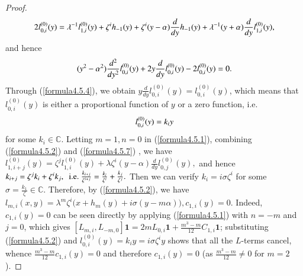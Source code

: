 \documentclass[12pt,reqno]{amsart}
\def\C{\mathbb{C}}
\numberwithin{equation}{section}
\begin{document}
\begin{proof}
\begin{equation*}
\aligned
2l_{0,i}^{(0)}(y)=\lambda^{-1}l_{1,i}^{(0)}(y)+\zeta^ih_{-1}(y)+\zeta^i(y-\alpha)\frac{d}{d{y}} h_{-1}(y)+\lambda^{-1}(y+\alpha)\frac{d}{d{y}} l_{1,i}^{(0)}(y),
\endaligned
\end{equation*}
and hence
\begin{equation}\label{formula4.5.6}
\aligned
(y^2-\alpha^2)\frac{d^2}{d{y^2}}l_{0,i}^{(0)}(y)+2y\frac{d}{d{y}}l_{0,i}^{(0)}(y)-2l_{0,i}^{(0)}(y)=0.
\endaligned
\end{equation}
Through (\ref{formula4.5.4}), we obtain $y\frac{d}{d{y}}l_{0,i}^{(0)}(y)=l_{0,i}^{(0)}(y)$, which means that $l_{0,i}^{(0)}(y)$ is either a proportional function of $y$ or a zero function, i.e. 
\begin{equation}\label{formula4.5.7}
\aligned
l_{0,i}^{(0)}(y)=k_iy
\endaligned
\end{equation}
 for some $k_i\in \C$. Letting $m=1,n=0$ in (\ref{formula4.5.1}), combining (\ref{formula4.5.2}) and (\ref{formula4.5.7}) ,  we have $l_{1,i+j}^{(0)}(y)=\zeta^jl_{1,i}^{(0)}(y)+\lambda\zeta^i(y-\alpha)\frac{d}{d{y}}l_{0,j}^{(0)}(y),$
and hence $k_{i+j}=\zeta^jk_i+\zeta^ik_j,\ {\rm\ i.e.}\ \frac{k_{i+j}}{\zeta^{i+j}}=\frac{k_i}{\zeta^i}+\frac{k_j}{\zeta^j}.$
Then we can verify $k_i=i\sigma \zeta^i$ for some $\sigma=\frac{k_1}{\zeta}\in \C$. Therefore, by (\ref{formula4.5.2}), we have $l_{m,i}(x,y)=\lambda^m\zeta^i\big(x+h_m(y)+i\sigma(y-m\alpha)\big), c_{1,i}(y)=0$. Indeed, $c_{1,i}(y)=0$ can be seen directly by applying (\ref{formula4.5.1}) with $n=-m$ and $j=0$, which gives $[L_{m,i},L_{-m,0}]\mathbf{1}=2mL_{0,i}\mathbf{1}+\frac{m^3-m}{12}C_{1,i}\mathbf{1}$; substituting (\ref{formula4.5.2}) and $l_{0,i}^{(0)}(y)=k_iy=i\sigma\zeta^iy$ shows that all the $L$-terms cancel, whence $\frac{m^3-m}{12}c_{1,i}(y)=0$ and therefore $c_{1,i}(y)=0$ (as $\frac{m^3-m}{12}\ne0$ for $m=2$).
\end{proof}
\end{document}
